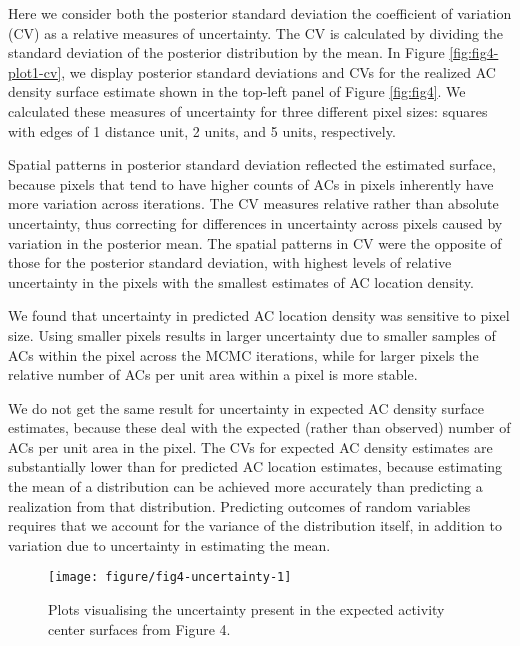 \documentclass[10pt,a4paper]{article}\usepackage[]{graphicx}\usepackage[]{xcolor}
\makeatletter
\def\maxwidth{ %
  \ifdim\Gin@nat@width>\linewidth
    \linewidth
  \else
    \Gin@nat@width
  \fi
}
\newenvironment{knitrout}{}{} %
\makeatother
\begin{document}
Here we consider both the posterior standard deviation the coefficient
of variation (CV) as a relative measures of uncertainty. The CV is
calculated by dividing the standard deviation of the posterior
distribution by the mean. In Figure \ref{fig:fig4-plot1-cv}, we
display posterior standard deviations and CVs for the realized AC
density surface estimate shown in the top-left panel of Figure
\ref{fig:fig4}. We calculated these measures of uncertainty for three
different pixel sizes: squares with edges of 1 distance unit, 2 units,
and 5 units, respectively.

Spatial patterns in posterior standard deviation reflected the
estimated surface, because pixels that tend to have higher counts of
ACs in pixels inherently have more variation across iterations. The CV
measures relative rather than absolute uncertainty, thus correcting
for differences in uncertainty across pixels caused by variation in
the posterior mean. The spatial patterns in CV were the opposite of
those for the posterior standard deviation, with highest levels of
relative uncertainty in the pixels with the smallest estimates of
AC location density.

We found that uncertainty in predicted AC location density was sensitive to
pixel size. Using smaller pixels results in larger uncertainty due to
smaller samples of ACs within the pixel across the MCMC iterations,
while for larger pixels the relative number of ACs per unit area
within a pixel is more stable.

We do not get the same result for uncertainty in expected AC density
surface estimates, because these deal with the expected (rather than
observed) number of ACs per unit area in the pixel. The CVs for
expected AC density estimates are substantially lower than for
predicted AC location estimates, because estimating the mean of a
distribution can be achieved more accurately than predicting a
realization from that distribution. Predicting outcomes of random
variables requires that we account for the variance of the
distribution itself, in addition to variation due to uncertainty in
estimating the mean.

\begin{knitrout}
\color{fgcolor}\begin{figure}
\texttt{[image: figure/fig4-uncertainty-1]} \caption[Plots visualising the uncertainty present in the expected activity center surfaces from Figure 4]{Plots visualising the uncertainty present in the expected activity center surfaces from Figure 4.}\label{fig:fig4-uncertainty}
\end{figure}

\end{knitrout}
\end{document}
